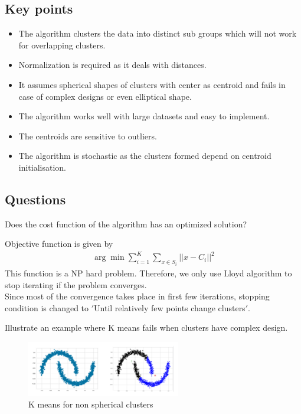 \documentclass[12pt,letterpaper, onecolumn]{exam}
\begin{document}
\subsection*{ Key points}
\begin{itemize}
\item The algorithm clusters the data into distinct sub groups which will not work for overlapping clusters.
\item Normalization is required as it deals with distances.
\item It assumes spherical shapes of clusters with center as  centroid and fails in case of complex designs or even elliptical shape.
\item The algorithm works well with large datasets and easy to implement.
\item The centroids are sensitive to outliers.
\item The algorithm is stochastic as the clusters formed depend on centroid initialisation.
\end{itemize}

\subsection*{Questions}
\begin{questions}
\question[] Does the cost function of the algorithm has an optimized solution?
\begin{Solution}
Objective function is given by
\begin{align*}
\arg \min \sum_{i=1}^K \sum_{x\in S_i} ||x - C_i||^2
\end{align*}
This function is a NP hard problem. Therefore, we only use Lloyd algorithm to stop iterating if the problem converges.\\
Since most of the convergence takes place in first few iterations, stopping condition is changed to $'$Until relatively few points change clusters$'$.
\end{Solution}
\question[] Illustrate an example where K means fails when clusters have complex design.\\
\begin{Solution}
\begin{figure}[!h]
\caption{K means for non spherical clusters}
\centering
\includegraphics[width = 0.6\textwidth]{../images/k means.png}
\end{figure}

\end{Solution}
\end{questions}
\end{document}
